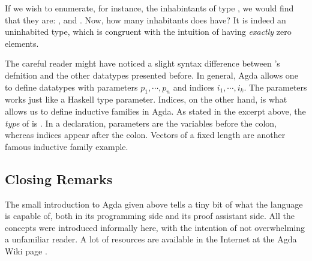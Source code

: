 
If we wish to enumerate, for instance, the inhabintants of type , we would find
that they are: ,  and . Now, how many inhabitants does  have?
It is indeed an uninhabited type, which is congruent with the intuition of having \emph{exactly} zero elements.

The careful reader might have noticed a slight syntax difference between 's defnition
and the other datatypes presented before. In general, Agda allows one to define datatypes
with parameters $p_1, \cdots, p_n$ and indices $i_1 , \cdots, i_k$. The parameters works just like
a Haskell type parameter. Indices, on the other hand, is what allows us to define inductive families
in Agda. As stated in the excerpt above, the \emph{type} of  is .
In a  declaration, parameters are the variables before the colon, whereas indices appear after the colon.
Vectors of a fixed length are another famous inductive family example. 

\subsection{Closing Remarks}

The small introduction to Agda given above tells a tiny bit of what the language is capable of,
both in its programming side and its proof assistant side. All the concepts were introduced
informally here, with the intention of not overwhelming a unfamiliar reader. A lot of resources
are available in the Internet at the Agda Wiki page \cite{AgdaTutorials}. 



